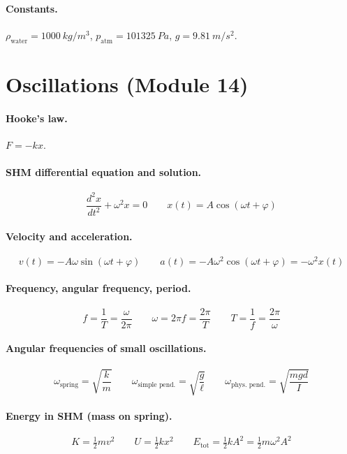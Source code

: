 \documentclass[11pt]{article}
\begin{document}
\paragraph{Constants.} $\rho_{\text{water}} = \SI{1000}{kg/m^3}$, $p_{\text{atm}} = \SI{101325}{Pa}$, $g = \SI{9.81}{m/s^2}$.

\section*{Oscillations (Module 14)}

\paragraph{Hooke's law.} $F = -kx$.

\paragraph{SHM differential equation and solution.}
\[
\frac{d^{2}x}{dt^{2}} + \omega^{2} x = 0
\qquad
x(t) = A\cos(\omega t + \varphi)
\]

\paragraph{Velocity and acceleration.}
\[
v(t) = -A\omega\sin(\omega t + \varphi)
\qquad
a(t) = -A\omega^{2}\cos(\omega t + \varphi) = -\omega^{2} x(t)
\]

\paragraph{Frequency, angular frequency, period.}
\[
f = \frac{1}{T} = \frac{\omega}{2\pi}
\qquad
\omega = 2\pi f = \frac{2\pi}{T}
\qquad
T = \frac{1}{f} = \frac{2\pi}{\omega}
\]

\paragraph{Angular frequencies of small oscillations.}
\[
\omega_{\text{spring}} = \sqrt{\frac{k}{m}}
\qquad
\omega_{\text{simple pend.}} = \sqrt{\frac{g}{\ell}}
\qquad
\omega_{\text{phys. pend.}} = \sqrt{\frac{m g d}{I}}
\]

\paragraph{Energy in SHM (mass on spring).}
\[
K = \tfrac{1}{2} m v^{2}
\qquad
U = \tfrac{1}{2} k x^{2}
\qquad
E_{\text{tot}} = \tfrac{1}{2} k A^{2} = \tfrac{1}{2} m \omega^{2} A^{2}
\]
\end{document}
